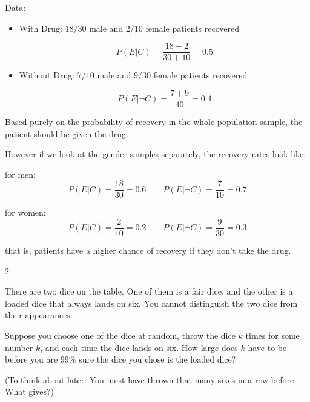 \documentclass[12pt]{article}
\begin{document}
\begin{solution}
    \bbni

    Data: 
    \begin{itemize}
        \item With Drug: $18/30$ male and $2/10$ female patients recovered
        
        \[P(E|C) = \frac{18+2}{30+10} = 0.5\]
        
        \item Without Drug: $7/10$ male and $9/30$ female patients recovered
        
        \[P(E|\neg C) = \frac{7+9}{40} = 0.4\]
    \end{itemize}
    Based purely on the probability of recovery in the whole population sample, the patient should be given the drug. 

    However if we look at the gender samples separately, the recovery rates look like: 

    for men: 
    \[P(E|C) = \frac{18}{30} = 0.6 \qquad P(E|\neg C) = \frac{7}{10} = 0.7\]

    for women: 
    \[P(E|C) = \frac{2}{10} = 0.2 \qquad P(E|\neg C) = \frac{9}{30} = 0.3\]

    that is, patients have a higher chance of recovery if they don't take the drug. 
\end{solution}

\newpage 

\begin{problem}{2}

    There are two dice on the table. One of them is a fair dice, and the other is a loaded dice
    that always lands on six. You cannot distinguish the two dice from their appearances.

    Suppose you choose one of the dice at random, throw the dice $k$ times for some number
    $k$, and each time the dice lands on six. How large does $k$ have to be before you are
    99\% sure the dice you chose is the loaded dice?

    (To think about later: You must have thrown that many sixes in a row before. What gives?)
\end{problem}
\end{document}
